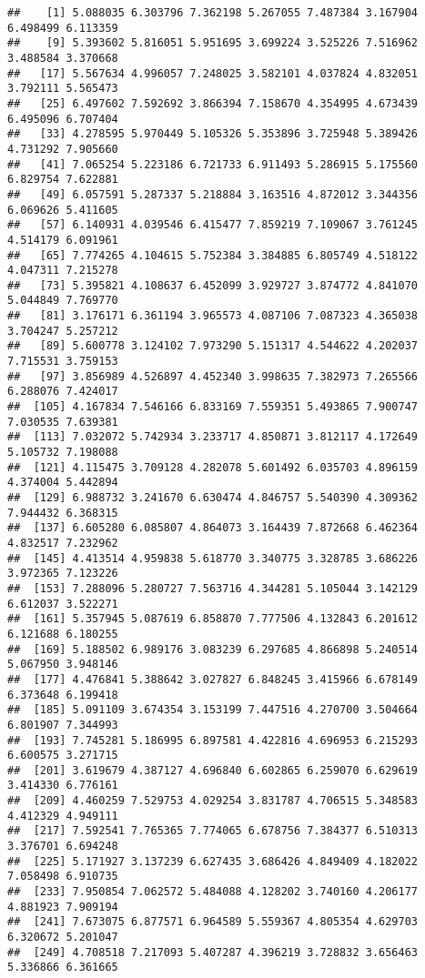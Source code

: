 \documentclass[
]{article}
\begin{document}
\begin{verbatim}
##    [1] 5.088035 6.303796 7.362198 5.267055 7.487384 3.167904 6.498499 6.113359
##    [9] 5.393602 5.816051 5.951695 3.699224 3.525226 7.516962 3.488584 3.370668
##   [17] 5.567634 4.996057 7.248025 3.582101 4.037824 4.832051 3.792111 5.565473
##   [25] 6.497602 7.592692 3.866394 7.158670 4.354995 4.673439 6.495096 6.707404
##   [33] 4.278595 5.970449 5.105326 5.353896 3.725948 5.389426 4.731292 7.905660
##   [41] 7.065254 5.223186 6.721733 6.911493 5.286915 5.175560 6.829754 7.622881
##   [49] 6.057591 5.287337 5.218884 3.163516 4.872012 3.344356 6.069626 5.411605
##   [57] 6.140931 4.039546 6.415477 7.859219 7.109067 3.761245 4.514179 6.091961
##   [65] 7.774265 4.104615 5.752384 3.384885 6.805749 4.518122 4.047311 7.215278
##   [73] 5.395821 4.108637 6.452099 3.929727 3.874772 4.841070 5.044849 7.769770
##   [81] 3.176171 6.361194 3.965573 4.087106 7.087323 4.365038 3.704247 5.257212
##   [89] 5.600778 3.124102 7.973290 5.151317 4.544622 4.202037 7.715531 3.759153
##   [97] 3.856989 4.526897 4.452340 3.998635 7.382973 7.265566 6.288076 7.424017
##  [105] 4.167834 7.546166 6.833169 7.559351 5.493865 7.900747 7.030535 7.639381
##  [113] 7.032072 5.742934 3.233717 4.850871 3.812117 4.172649 5.105732 7.198088
##  [121] 4.115475 3.709128 4.282078 5.601492 6.035703 4.896159 4.374004 5.442894
##  [129] 6.988732 3.241670 6.630474 4.846757 5.540390 4.309362 7.944432 6.368315
##  [137] 6.605280 6.085807 4.864073 3.164439 7.872668 6.462364 4.832517 7.232962
##  [145] 4.413514 4.959838 5.618770 3.340775 3.328785 3.686226 3.972365 7.123226
##  [153] 7.288096 5.280727 7.563716 4.344281 5.105044 3.142129 6.612037 3.522271
##  [161] 5.357945 5.087619 6.858870 7.777506 4.132843 6.201612 6.121688 6.180255
##  [169] 5.188502 6.989176 3.083239 6.297685 4.866898 5.240514 5.067950 3.948146
##  [177] 4.476841 5.388642 3.027827 6.848245 3.415966 6.678149 6.373648 6.199418
##  [185] 5.091109 3.674354 3.153199 7.447516 4.270700 3.504664 6.801907 7.344993
##  [193] 7.745281 5.186995 6.897581 4.422816 4.696953 6.215293 6.600575 3.271715
##  [201] 3.619679 4.387127 4.696840 6.602865 6.259070 6.629619 3.414330 6.776161
##  [209] 4.460259 7.529753 4.029254 3.831787 4.706515 5.348583 4.412329 4.949111
##  [217] 7.592541 7.765365 7.774065 6.678756 7.384377 6.510313 3.376701 6.694248
##  [225] 5.171927 3.137239 6.627435 3.686426 4.849409 4.182022 7.058498 6.910735
##  [233] 7.950854 7.062572 5.484088 4.128202 3.740160 4.206177 4.881923 7.909194
##  [241] 7.673075 6.877571 6.964589 5.559367 4.805354 4.629703 6.320672 5.201047
##  [249] 4.708518 7.217093 5.407287 4.396219 3.728832 3.656463 5.336866 6.361665

\end{verbatim}
\end{document}
